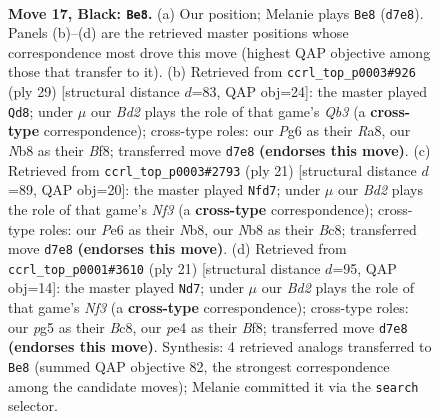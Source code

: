 \documentclass[11pt]{article}
\begin{document}
\clearpage

\begin{figure}[p]\centering
\begin{subfigure}{0.46\textwidth}\centering
\resizebox{\linewidth}{!}{%
\newchessgame
\chessboard[
  setfen={rn5r/ppqbk1bp/3pp1p1/1B2p1Pn/4P3/2N1B3/PPPK1PQP/3RR3 b - - 3 17},
  showmover=false,
  pgfstyle=straightmove, color=movearrow, markmove={d7-e8}
]}
\caption{}
\end{subfigure}\hfill
\begin{subfigure}{0.46\textwidth}\centering
\resizebox{\linewidth}{!}{%
\newchessgame
\chessboard[
  setfen={r3kb1r/1b1p1ppp/pq2p1n1/n3P3/1p2N3/3BBN2/1PP2PPP/R2Q1RK1 b kq - 5 15},
  showmover=false,
  pgfstyle=straightmove, color=movearrow, markmove={b6-d8}
]}
\caption{}
\end{subfigure}
\\[4pt]
\begin{subfigure}{0.46\textwidth}\centering
\resizebox{\linewidth}{!}{%
\newchessgame
\chessboard[
  setfen={rnb1k2r/1pq1bppp/p3pn2/4P3/8/1NNB4/PPP3PP/R1BQ1RK1 b kq - 0 11},
  showmover=false,
  pgfstyle=straightmove, color=movearrow, markmove={f6-d7}
]}
\caption{}
\end{subfigure}\hfill
\begin{subfigure}{0.46\textwidth}\centering
\resizebox{\linewidth}{!}{%
\newchessgame
\chessboard[
  setfen={r1b1kb1r/2q2ppp/ppn1pn2/3pP3/P4P2/1NNB4/1PP3PP/R1BQ1RK1 b kq - 0 11},
  showmover=false,
  pgfstyle=straightmove, color=movearrow, markmove={f6-d7}
]}
\caption{}
\end{subfigure}
\caption{\textbf{Move 17, Black: \texttt{Be8}.} (a) Our position; Melanie plays \texttt{Be8} (\texttt{d7e8}). Panels (b)--(d) are the retrieved master positions whose correspondence most drove this move (highest QAP objective among those that transfer to it). (b) Retrieved from \texttt{ccrl\_top\_p0003\#926} (ply 29) [structural distance $d$=83, QAP obj=24]: the master played \texttt{Qd8}; under $\mu$ our \emph{Bd2} plays the role of that game's \emph{Qb3} (a \textbf{cross-type} correspondence); cross-type roles: our \emph{P}g6 as their \emph{R}a8, our \emph{N}b8 as their \emph{B}f8; transferred move \texttt{d7e8} \textbf{(endorses this move)}. (c) Retrieved from \texttt{ccrl\_top\_p0003\#2793} (ply 21) [structural distance $d$=89, QAP obj=20]: the master played \texttt{Nfd7}; under $\mu$ our \emph{Bd2} plays the role of that game's \emph{Nf3} (a \textbf{cross-type} correspondence); cross-type roles: our \emph{P}e6 as their \emph{N}b8, our \emph{N}b8 as their \emph{B}c8; transferred move \texttt{d7e8} \textbf{(endorses this move)}. (d) Retrieved from \texttt{ccrl\_top\_p0001\#3610} (ply 21) [structural distance $d$=95, QAP obj=14]: the master played \texttt{Nd7}; under $\mu$ our \emph{Bd2} plays the role of that game's \emph{Nf3} (a \textbf{cross-type} correspondence); cross-type roles: our \emph{p}g5 as their \emph{B}c8, our \emph{p}e4 as their \emph{B}f8; transferred move \texttt{d7e8} \textbf{(endorses this move)}. Synthesis: 4 retrieved analogs transferred to \texttt{Be8} (summed QAP objective 82, the strongest correspondence among the candidate moves); Melanie committed it via the \texttt{search} selector.}
\label{fig:thought-m33}
\end{figure}
\end{document}
